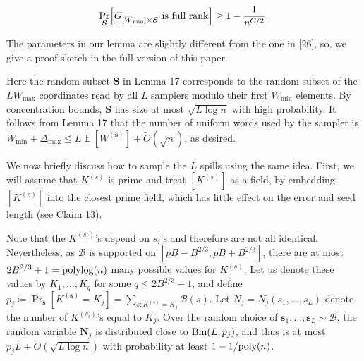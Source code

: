 \[\begin{gathered}
\Pr_{\boldsymbol{S}}\Bigl[\text{$G_{[\overline{W}_{\min}]\times\boldsymbol{S}}$ is full rank}\Bigr]\geq 1-\frac{1}{n^{C/2}}.
\end{gathered}\]






The parameters in our lemma are slightly different from the one in [26], so, we give a proof sketch in the full version of this paper.\par




Here the random subset $\boldsymbol{S}$ in Lemma 17 corresponds to the random subset of the $LW_{\max}$ coordinates read by all $L$ samplers modulo their first $W_{\min}$ elements.
By concentration bounds, $\boldsymbol{S}$ has size at most $\sqrt{L\log n}$ with high probability.
It follows from Lemma 17 that the number of uniform words used by the sampler is $\overline{W}_{\min}+\overline{\Delta}_{\max}\leq L\operatorname{\mathbb{E}}[W^{(\boldsymbol{s})}]+\widetilde{O}(\sqrt{n})$, as desired.\par




We now briefly discuss how to sample the $L$ spills using the same idea.
First, we will assume that $K^{(s)}$ is prime and treat $[K^{(s)}]$ as a field, by embedding $[K^{(s)}]$ into the closest prime field, which has little effect on the error and seed length (see Claim 13).\par




Note that the $K^{(s_{i})}$’s depend on $s_{i}$’s and therefore are not all identical.
Nevertheless, as $\mathcal{B}$ is supported on $[pB-B^{2/3},pB+B^{2/3}]$, there are at most $2B^{2/3}+1=\textnormal{polylog}(n)$ many possible values for $K^{(s)}$.
Let us denote these values by $K_{1},\ldots,K_{q}$ for some $q\leq 2B^{2/3}+1$, and define $p_{j}\coloneq\Pr_{\boldsymbol{s}}[K^{(\boldsymbol{s})}=K_{j}]=\sum_{s:K^{(s)}=K_{j}}\mathcal{B}(s)$.
Let $N_{j}=N_{j}(s_{1},\ldots,s_{L})$ denote the number of $K^{(s_{i})}$’s equal to $K_{j}$.
Over the random choice of $\boldsymbol{s}_{1},\ldots,\boldsymbol{s}_{L}\sim\mathcal{B}$, the random variable $\boldsymbol{N}_{j}$ is distributed close to $\textnormal{Bin}(L,p_{j})$, and thus is at most $p_{j}L+O(\sqrt{L\log n})$ with probability at least $1-1/\textnormal{poly}(n)$.\par




